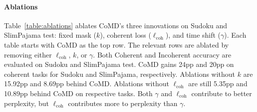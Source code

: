 \documentclass{article} %
\begin{document}
\paragraph{Ablations}
Table~\ref{table:ablations} ablates CoMD's three innovations on Sudoku and SlimPajama test: fixed mask ($k$), coherent loss ($\ell_\mathrm{coh}$), and time shift ($\gamma$). Each table starts with CoMD as the top row. The relevant rows are ablated by removing either $\ell_\mathrm{coh}$, $k$, or $\gamma$. Both Coherent and Incoherent accuracy are evaluated on Sudoku and SlimPajama test. CoMD gains 24pp and 20pp on coherent tasks for Sudoku and SlimPajama, respectively. Ablations without $k$ are 15.92pp and 8.69pp behind CoMD. Ablations without $\ell_\mathrm{coh}$ are still 5.35pp and 10.89pp behind CoMD on respective tasks. Both $\gamma$ and $\ell_\mathrm{coh}$ contribute to better perplexity, but $\ell_\mathrm{coh}$ contributes more to perplexity than $\gamma$. 
\end{document}
